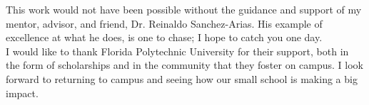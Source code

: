 %
%
%

\begin{acknowledgments}
This work would not have been possible without the guidance and support of my mentor, advisor, and friend, Dr. Reinaldo Sanchez-Arias. His example of excellence at what he does, is one to chase; I hope to catch you one day.\\

I would like to thank Florida Polytechnic University for their support, both in the form of scholarships and in the community that they foster on campus. I look forward to returning to campus and seeing how our small school is making a big impact. 
\end{acknowledgments}

\pagebreak